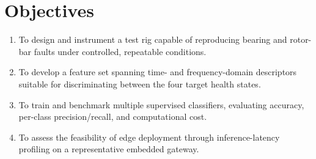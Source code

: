 \section{Objectives}
\begin{enumerate}
  \item To design and instrument a test rig capable of reproducing bearing and rotor-bar faults
        under controlled, repeatable conditions.
  \item To develop a feature set spanning time- and frequency-domain descriptors suitable for
        discriminating between the four target health states.
  \item To train and benchmark multiple supervised classifiers, evaluating accuracy,
        per-class precision/recall, and computational cost.
  \item To assess the feasibility of edge deployment through inference-latency profiling on a
        representative embedded gateway.
\end{enumerate}
